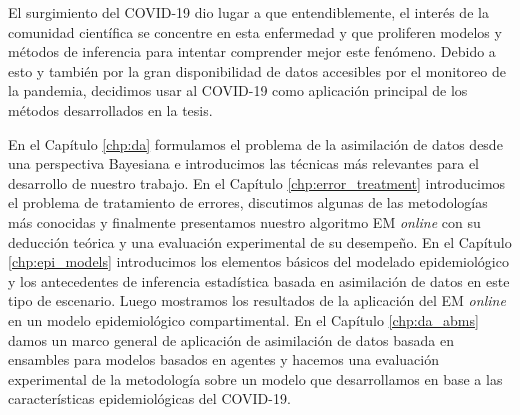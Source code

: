 El surgimiento del COVID-19 dio lugar a que entendiblemente, el interés de la comunidad científica se concentre en esta enfermedad y que proliferen modelos y métodos de inferencia para intentar comprender mejor este fenómeno. Debido a esto y también por la gran disponibilidad de datos accesibles por el monitoreo de la pandemia, decidimos usar al COVID-19 como aplicación principal de los métodos desarrollados en la tesis.


En el Capítulo \ref{chp:da} formulamos el problema de la asimilación de datos desde una perspectiva Bayesiana e introducimos las técnicas más relevantes para el desarrollo de nuestro trabajo. En el Capítulo \ref{chp:error_treatment} introducimos el problema de tratamiento de errores, discutimos algunas de las metodologías más conocidas y finalmente presentamos nuestro algoritmo EM \textit{online} con su deducción teórica y una evaluación experimental de su desempeño. En el Capítulo \ref{chp:epi_models} introducimos los elementos básicos del modelado epidemiológico y los antecedentes de inferencia estadística basada en asimilación de datos en este tipo de escenario. Luego mostramos los resultados de la aplicación del EM \textit{online} en un modelo epidemiológico compartimental. En el Capítulo \ref{chp:da_abms} damos un marco general de aplicación de asimilación de datos basada en ensambles para modelos basados en agentes y hacemos una evaluación experimental de la metodología sobre un modelo que desarrollamos en base a las características epidemiológicas del COVID-19.
